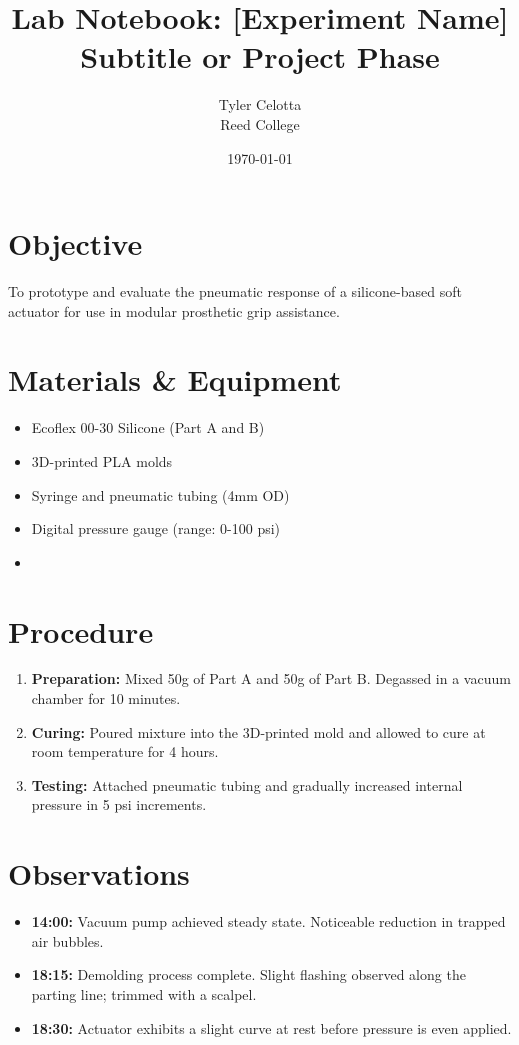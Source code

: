 \documentclass[11pt, letterpaper]{article}
\title{\textbf{Lab Notebook: [Experiment Name]}\\ \large Subtitle or Project Phase}
\author{Tyler Celotta \\ Reed College}
\date{\today}
\begin{document}
\maketitle
\thispagestyle{fancy} %

\section{Objective}
To prototype and evaluate the pneumatic response of a silicone-based soft actuator for use in modular prosthetic grip assistance.

\section{Materials \& Equipment}
\begin{itemize}[noitemsep]
    \item Ecoflex 00-30 Silicone (Part A and B)
    \item 3D-printed PLA molds
    \item Syringe and pneumatic tubing (4mm OD)
    \item Digital pressure gauge (range: 0-100 psi)
    \item [Add other materials here]
\end{itemize}

\section{Procedure}
\begin{enumerate}
    \item \textbf{Preparation:} Mixed 50g of Part A and 50g of Part B. Degassed in a vacuum chamber for 10 minutes.
    \item \textbf{Curing:} Poured mixture into the 3D-printed mold and allowed to cure at room temperature for 4 hours.
    \item \textbf{Testing:} Attached pneumatic tubing and gradually increased internal pressure in 5 psi increments.
\end{enumerate}

\section{Observations}
\begin{itemize}
    \item \textbf{14:00:} Vacuum pump achieved steady state. Noticeable reduction in trapped air bubbles.
    \item \textbf{18:15:} Demolding process complete. Slight flashing observed along the parting line; trimmed with a scalpel.
    \item \textbf{18:30:} Actuator exhibits a slight curve at rest before pressure is even applied.
\end{itemize}
\end{document}
